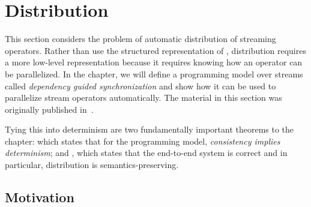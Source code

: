 \chapter{Distribution}
\label{cha:distribution}

This section considers the problem of automatic distribution of streaming operators.
Rather than use the structured representation of ,
distribution requires a more low-level representation because it requires knowing how an operator can be parallelized.
In the chapter, we will define a programming model over streams called \emph{dependency guided synchronization} and show how it can be used to parallelize stream operators automatically.
The material in this section was originally published in~.

Tying this into determinism are two fundamentally important theorems to the chapter:  which states that for the programming model, \emph{consistency implies determinism}; and , which states that the end-to-end system is correct and in particular, distribution is semantics-preserving.

\section{Motivation}

